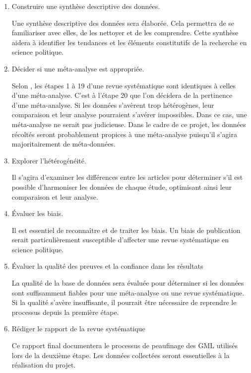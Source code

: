 \documentclass[
  letterpaper,
]{scrbook}
\begin{document}
\begin{enumerate}
  \item Construire une synthèse descriptive des données.
  
    Une synthèse descriptive des données sera élaborée. Cela permettra de se familiariser avec elles, de les nettoyer et de les comprendre. Cette synthèse aidera à identifier les tendances et les éléments constitutifs de la recherche en science politique.

  \item Décider si une méta-analyse est appropriée.
  
    Selon \textcite[7]{muka_etal20}, les étapes 1 à 19 d'une revue systématique sont identiques à celles d'une méta-analyse. C'est à l'étape 20 que l'on décidera de la pertinence d'une méta-analyse. Si les données s'avèrent trop hétérogènes, leur comparaison et leur analyse pourraient s'avérer impossibles. Dans ce cas, une méta-analyse ne serait pas judicieuse. Dans le cadre de ce projet, les données récoltés seront probablement propices à une méta-analyse puisqu'il s'agira majoritairement de méta-données.

  \item Explorer l'hétérogénéité.
  
    Il s'agira d'examiner les différences entre les articles pour déterminer s'il est possible d'harmoniser les données de chaque étude, optimisant ainsi leur comparaison et leur analyse.

  \item Évaluer les biais.
  
    Il est essentiel de reconnaître et de traiter les biais. Un biais de publication serait particulièrement susceptible d'affecter une revue systématique en science politique.

  \item Évaluer la qualité des preuves et la confiance dans les résultats
  
    La qualité de la base de données sera évaluée pour déterminer si les données sont suffisamment fiables pour une méta-analyse ou une revue systématique. Si la qualité s'avère insuffisante, il pourrait être nécessaire de reprendre le processus depuis la première étape.

  \item Rédiger le rapport de la revue systématique
  
    Ce rapport final documentera le processus de peaufinage des GML utilisés lors de la deuxième étape. Les données collectées seront essentielles à la réalisation du projet.

\end{enumerate}
\end{document}
